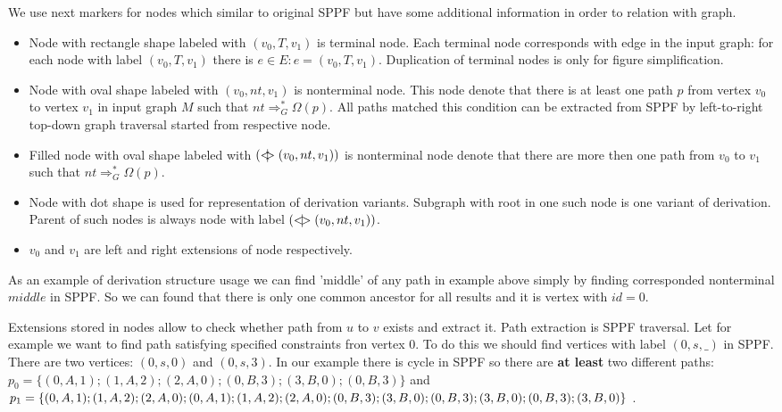 \documentclass{sig-alternate} %
\begin{document}
We use next markers for nodes which similar to original SPPF but have some additional information in order to relation with graph.
\begin{itemize}
    \item Node with rectangle shape labeled with $(v_0, T, v_1)$ is terminal node. 
    Each terminal node corresponds with edge in the input graph: for each node with label $(v_0, T, v_1)$ there is $e\in E: e=(v_0,T,v_1)$.
    Duplication of terminal nodes is only for figure simplification.
    \item Node with oval shape labeled with $(v_0, nt, v_1)$ is nonterminal node. 
    This node denote that there is at least one path $p$ from vertex $v_0$ to vertex $v_1$ in input graph $M$ such that $nt \Rightarrow^*_G \Omega(p)$.
    All paths matched this condition can be extracted from SPPF by left-to-right top-down graph traversal started from respective node. 
    \item Filled node with oval shape labeled with $(<\mkern-11mu | \mkern-11mu> (v_0, nt, v_1))$ is nonterminal node denote that there are more then one path from $v_0$ to $v_1$ such that $nt \Rightarrow^*_G \Omega(p)$.
    \item Node with dot shape is used for representation of derivation variants.
    Subgraph with root in one such node is one variant of derivation.
    Parent of such nodes is always node with label $(<\mkern-9mu | \mkern-9mu> (v_0, nt, v_1))$.
    \item $v_0$ and $v_1$ are left and right extensions of node respectively.
\end{itemize}

As an example of derivation structure usage we can find 'middle' of any path in example above simply by finding corresponded nonterminal $middle$ in SPPF.
So we can found that there is only one common ancestor for all results and it is vertex with $id = 0$. 

Extensions stored in nodes allow to check whether path from $u$ to $v$ exists and extract it. 
Path extraction is SPPF traversal. 
Let for example we want to find path satisfying specified constraints fron vertex $0$.
To do this we should find vertices with label $(0, s, \_)$ in SPPF. There are two vertices: $(0, s, 0)$ and $(0, s , 3)$.
In our example there is cycle in SPPF so there are \textbf{at least} two different paths: $p_0=\{(0,A,1);(1,A,2);(2,A,0);(0,B,3);(3,B,0);(0,B,3)\}$ and $p_1=\{(0,A,1);(1,A,2);(2,A,0);(0,A,1);(1,A,2);(2,A,0);\\ (0,B,3);(3,B,0);(0,B,3);(3,B,0);(0,B,3);(3,B,0)\}$ .
\end{document}
